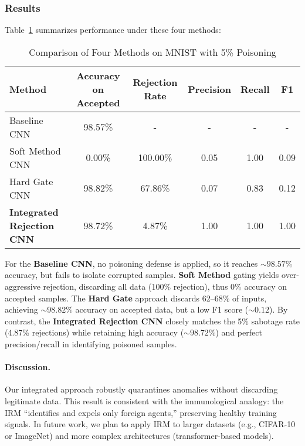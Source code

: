 \documentclass[12pt]{article}
\begin{document}
\subsubsection{Results}
\label{subsubsec:comp_results}

Table~\ref{tab:integrated_results} summarizes performance under these four methods:

\begin{table}[ht]
\centering
\caption{Comparison of Four Methods on MNIST with 5\% Poisoning}
\label{tab:integrated_results}
\begin{tabular}{lccccc}
\hline
\textbf{Method} & \textbf{Accuracy on Accepted} & \textbf{Rejection Rate} & \textbf{Precision} & \textbf{Recall} & \textbf{F1} \\
\hline
Baseline CNN & 98.57\% & - & - & - & - \\
Soft Method CNN & 0.00\% & 100.00\% & 0.05 & 1.00 & 0.09 \\
Hard Gate CNN & 98.82\% & 67.86\% & 0.07 & 0.83 & 0.12 \\
\textbf{Integrated Rejection CNN} & 98.72\% & 4.87\% & 1.00 & 1.00 & 1.00 \\
\hline
\end{tabular}
\end{table}

For the \textbf{Baseline CNN}, no poisoning defense is applied, so it
reaches $\sim98.57\%$ accuracy, but fails to isolate corrupted samples. 
\textbf{Soft Method} gating yields over-aggressive rejection, discarding
all data (100\% rejection), thus 0\% accuracy on accepted samples.
The \textbf{Hard Gate} approach discards 62--68\% of inputs,
achieving $\sim98.82\%$ accuracy on accepted data, but a low F1 
score ($\sim0.12$). By contrast, the \textbf{Integrated Rejection CNN}
closely matches the 5\% sabotage rate (4.87\% rejections) while retaining
high accuracy ($\sim98.72\%$) and perfect precision/recall in identifying
poisoned samples.

\paragraph{Discussion.}
Our integrated approach robustly quarantines anomalies without discarding
legitimate data. This result is consistent with the immunological analogy:
the IRM “identifies and expels only foreign agents,” preserving healthy
training signals. In future work, we plan to apply IRM to larger datasets
(e.g., CIFAR-10 or ImageNet) and more complex architectures (transformer-based
models).
\end{document}
